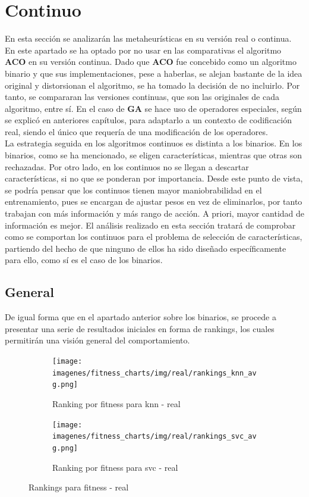 \section{Continuo}
En esta sección se analizarán las metaheurísticas en su versión real o continua. En este apartado se ha optado por no usar en las comparativas el algoritmo \textbf{ACO} en su versión continua. Dado que \textbf{ACO} fue concebido como un algoritmo binario y que sus implementaciones, pese a haberlas, se alejan bastante de la idea original y distorsionan el algoritmo, se ha tomado la decisión de no incluirlo. Por tanto, se compararan las versiones continuas, que son las originales de cada algoritmo, entre sí. En el caso de \textbf{GA} se hace uso de operadores especiales, según se explicó en anteriores capítulos, para adaptarlo a un contexto de codificación real, siendo el único que requería de una modificación de los operadores.\\[6pt]
La estrategia seguida en los algoritmos continuos es distinta a los binarios. En los binarios, como se ha mencionado, se eligen características, mientras que otras son rechazadas. Por otro lado, en los continuos no se llegan a descartar características, si no que se ponderan por importancia. Desde este punto de vista, se podría pensar que los continuos tienen mayor maniobrabilidad en el entrenamiento, pues se encargan de ajustar pesos en vez de eliminarlos, por tanto trabajan con más información y más rango de acción. A priori, mayor cantidad de información es mejor. El análisis realizado en esta sección tratará de comprobar como se comportan los continuos para el problema de selección de características, partiendo del hecho de que ninguno de ellos ha sido diseñado específicamente para ello, como sí es el caso de los binarios.

\subsection{General}
De igual forma que en el apartado anterior sobre los binarios, se procede a presentar una serie de resultados iniciales en forma de rankings, los cuales permitirán una visión general del comportamiento.

\begin{figure}[htp]
    \centering
    \begin{subfigure}[htp]{1\textwidth}
        \texttt{[image: imagenes/fitness\_charts/img/real/rankings\_knn\_avg.png]}
        \caption{Ranking por fitness para knn - real}
        \label{fig:ranking_knn_real}
    \end{subfigure}
    \begin{subfigure}[htp]{1\textwidth}
        \texttt{[image: imagenes/fitness\_charts/img/real/rankings\_svc\_avg.png]}
        \caption{Ranking por fitness para svc - real}
        \label{fig:ranking_svc_real}
    \end{subfigure}
    \caption{Rankings para fitness - real}
    \label{fig:rankings_real}
\end{figure}

